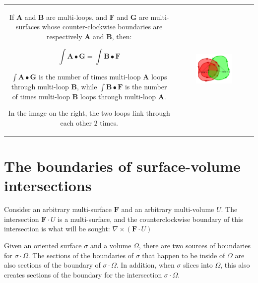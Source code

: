 \documentclass{book}
\begin{document}
\begin{tabular}{cc}
\parbox{0.5\textwidth}{
If \(\mathbf{A}\) and \(\mathbf{B}\) are multi-loops, and \(\mathbf{F}\) and \(\mathbf{G}\) are multi-surfaces whose counter-clockwise boundaries are respectively \(\mathbf{A}\) and \(\mathbf{B}\), then:

\[\int \mathbf{A} \bullet \mathbf{G} = \int \mathbf{B} \bullet \mathbf{F}\]

\(\int \mathbf{A} \bullet \mathbf{G}\) is the number of times multi-loop \(\mathbf{A}\) loops through multi-loop \(\mathbf{B}\), while \(\int \mathbf{B} \bullet \mathbf{F}\) is the number of times multi-loop \(\mathbf{B}\) loops through multi-loop \(\mathbf{A}\).

In the image on the right, the two loops link through each other \(2\) times. 
} & \parbox{0.5\textwidth}{
\includegraphics[width = 0.5\textwidth]{Boundaries/Path_endpoints/Stokes_theorem}
}
\end{tabular}




\section{The boundaries of surface-volume intersections}

Consider an arbitrary multi-surface \(\mathbf{F}\) and an arbitrary multi-volume \(U\). The intersection \(\mathbf{F} \cdot U\) is a multi-surface, and the counterclockwise boundary of this intersection is what will be sought: \(\nabla \times (\mathbf{F} \cdot U)\) 

Given an oriented surface \(\sigma\) and a volume \(\Omega\), there are two sources of boundaries for \(\sigma \cdot \Omega\). The sections of the boundaries of \(\sigma\) that happen to be inside of \(\Omega\) are also sections of the boundary of \(\sigma \cdot \Omega\). In addition, when \(\sigma\) slices into \(\Omega\), this also creates sections of the boundary for the intersection \(\sigma \cdot \Omega\).   
\end{document}
